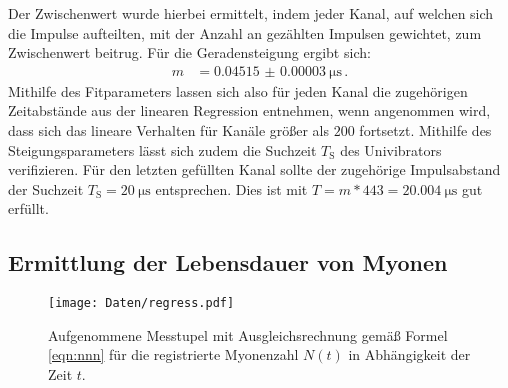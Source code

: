 Der Zwischenwert wurde hierbei ermittelt, indem jeder Kanal, auf welchen sich die Impulse aufteilten, mit der Anzahl an gezählten Impulsen gewichtet, zum Zwischenwert beitrug.
Für die Geradensteigung ergibt sich:
\begin{equation*}
	\begin{split}
		m &= \SI{0.04515(3)}{\micro\second} \,\mathrm{.}
	\end{split}
\end{equation*}
Mithilfe des Fitparameters lassen sich also für jeden Kanal die zugehörigen Zeitabstände aus der linearen Regression entnehmen, wenn angenommen wird, dass sich das lineare Verhalten für Kanäle größer als $\num{200}$ fortsetzt.
Mithilfe des Steigungsparameters lässt sich zudem die Suchzeit $T_{\mathrm{S}}$ des Univibrators verifizieren.
Für den letzten gefüllten Kanal sollte der zugehörige Impulsabstand der Suchzeit $T_{\mathrm{S}}=\SI{20}{\micro\second}$ entsprechen.
Dies ist mit $T=m*443=\SI{20.004}{\micro\second}$ gut erfüllt.

%
\FloatBarrier
\subsection{Ermittlung der Lebensdauer von Myonen}
\begin{figure}
  \centering
  \texttt{[image: Daten/regress.pdf]}
	\caption{Aufgenommene Messtupel mit Ausgleichsrechnung gemäß Formel \eqref{eqn:nnn} für die registrierte Myonenzahl $N(t)$ in Abhängigkeit der Zeit $t$.}
  \label{fig:blubbb}
\end{figure}

